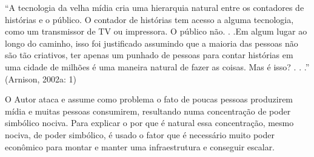 \begin{directcite}
“A tecnologia da velha mídia cria uma hierarquia natural entre os contadores de histórias e o público. O contador de histórias tem acesso a alguma tecnologia, como um transmissor de TV ou impressora. O público não. . .Em algum lugar ao longo do caminho, isso foi justificado assumindo que a maioria das pessoas não são tão criativos, ter apenas um punhado de pessoas para contar histórias em uma cidade de milhões é uma maneira natural de fazer as coisas. Mas é isso? . . .” (Arnison, 2002a: 1)
\end{directcite}

O Autor ataca e assume como problema o fato de poucas pessoas produzirem mídia e muitas pessoas consumirem, resultando numa concentração de poder simbólico nociva. Para explicar o por que é natural essa concentração, mesmo nociva, de poder simbólico, é usado o fator que é necessário muito poder econômico para montar e manter uma infraestrutura e conseguir escalar.

